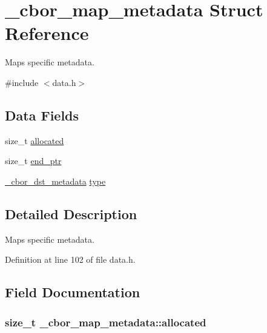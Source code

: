 \hypertarget{struct__cbor__map__metadata}{\section{\-\_\-cbor\-\_\-map\-\_\-metadata Struct Reference}
\label{struct__cbor__map__metadata}
}


Maps specific metadata.  




{\ttfamily \#include $<$data.\-h$>$}

\subsection*{Data Fields}
\begin{DoxyCompactItemize}
\item 
size\-\_\-t \hyperlink{struct__cbor__map__metadata_a6eb16c3f11be5cecbbf8ab8bae689527}{allocated}
\item 
size\-\_\-t \hyperlink{struct__cbor__map__metadata_a38136af91105ba320f1d95a4a4ceb4de}{end\-\_\-ptr}
\item 
\hyperlink{data_8h_a3cdab5e05cf46846e98b43cf77985589}{\-\_\-cbor\-\_\-dst\-\_\-metadata} \hyperlink{struct__cbor__map__metadata_aace4f7da19acf93e56eeb8ccf0fae7b5}{type}
\end{DoxyCompactItemize}


\subsection{Detailed Description}
Maps specific metadata. 

Definition at line 102 of file data.\-h.



\subsection{Field Documentation}
\hypertarget{struct__cbor__map__metadata_a6eb16c3f11be5cecbbf8ab8bae689527}{
\subsubsection[{allocated}]{\setlength{\rightskip}{0pt plus 5cm}size\-\_\-t \-\_\-cbor\-\_\-map\-\_\-metadata\-::allocated}}\label{struct__cbor__map__metadata_a6eb16c3f11be5cecbbf8ab8bae689527}


